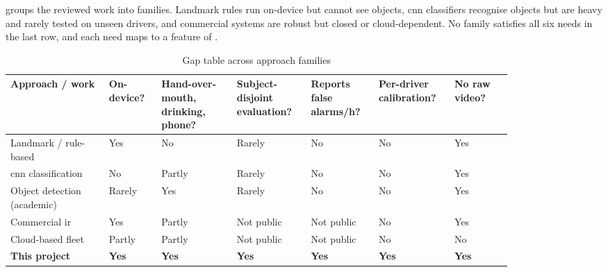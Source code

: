  groups the reviewed work into families. Landmark rules run on-device but cannot see objects, \gls{cnn} classifiers recognise objects but are heavy and rarely tested on unseen drivers, and commercial systems are robust but closed or cloud-dependent. No family satisfies all six needs in the last row, and each need maps to a feature of .



\begin{table}[htbp]
\centering
\caption{Gap table across approach families}
\label{tab:ch2-04}
\footnotesize
\setlength{\tabcolsep}{3pt}
\renewcommand{\arraystretch}{1.15}
\begin{tabular}{|p{0.170\linewidth}|p{0.090\linewidth}|p{0.135\linewidth}|p{0.125\linewidth}|p{0.110\linewidth}|p{0.110\linewidth}|p{0.105\linewidth}|}
\hline
\textbf{Approach / work} & \textbf{On-device?} & \textbf{Hand-over-mouth, drinking, phone?} & \textbf{Subject-disjoint evaluation?} & \textbf{Reports false alarms/h?} & \textbf{Per-driver calibration?} & \textbf{No raw video?} \\
\hline
Landmark / rule-based \cite{r35,r40,r41} & Yes & No & Rarely & No & No & Yes \\
\hline
\gls{cnn} classification \cite{r32,r34,r33} & No & Partly & Rarely & No & No & Yes \\
\hline
Object detection (academic) & Rarely & Yes & Rarely & No & No & Yes \\
\hline
Commercial \gls{ir} \cite{r62} & Yes & Partly & Not public & Not public & No & Yes \\
\hline
Cloud-based fleet \cite{r61,r63,r64} & Partly & Partly & Not public & Not public & No & No \\
\hline
\textbf{This project} & \textbf{Yes} & \textbf{Yes} & \textbf{Yes} & \textbf{Yes} & \textbf{Yes} & \textbf{Yes} \\
\hline
\end{tabular}
\end{table}
